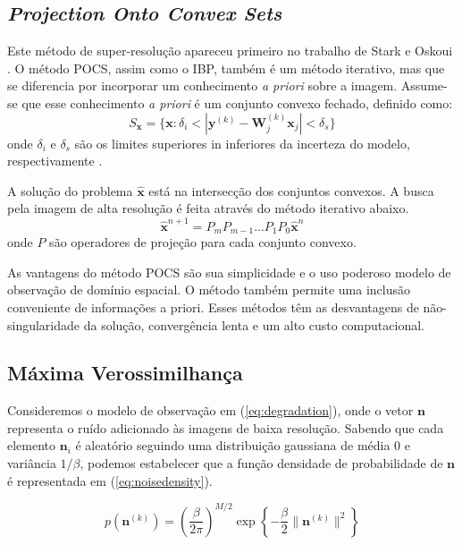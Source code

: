 \subsection{\emph{Projection Onto Convex Sets}}
Este método de super-resolução apareceu primeiro no trabalho de Stark e Oskoui \cite{stark1989high}.
O método POCS, assim como o IBP, também é um método iterativo, mas que se diferencia por incorporar um conhecimento \emph{a priori} sobre a imagem. Assume-se que esse conhecimento \emph{a priori} é um conjunto convexo fechado, definido como:
\begin{equation}
	S_{\mathbf{x}} = \{ \mathbf{x} : \delta_i < |\mathbf{y}^{(k)}-\mathbf{W}^{(k)}_j \mathbf{x}_j| < \delta_s \}
\end{equation}
onde $\delta_i$ e $\delta_s$ são os limites superiores in inferiores da incerteza do modelo, respectivamente \cite{nasrollahi2014super}.

A solução do problema $\hat{\mathbf{x}}$ está na intersecção dos conjuntos convexos. A busca pela imagem de alta resolução é feita através do método iterativo abaixo\cite{reis2014metodo}.
\begin{equation}
	\hat{\mathbf{x}}^{n+1} = P_m P_{m-1} ... P_1 P_0 \hat{\mathbf{x}}^{n}
\end{equation}
onde $P$ são operadores de projeção para cada conjunto convexo.

\begin{citacao}
As vantagens do método POCS são sua simplicidade e o uso poderoso modelo de observação de domínio espacial. O método também permite uma inclusão conveniente de informações a priori. Esses métodos têm as desvantagens de não-singularidade da solução, convergência lenta e um alto custo computacional. \cite{park2003super}
\end{citacao}

\subsection{Máxima Verossimilhança}
\label{sec:metodosprob}

Consideremos o modelo de observação em (\ref{eq:degradation}), onde o vetor
$\mathbf{n}$ representa o ruído adicionado às imagens de baixa resolução.
Sabendo que cada elemento $\mathbf{n}_i$ é aleatório seguindo uma distribuição
gaussiana de média 0 e variância $1/\beta$, podemos estabelecer que a função
densidade de probabilidade de $\mathbf{n}$ é representada em (\ref{eq:noisedensity}).

\begin{equation}
	\label{eq:noisedensity}
	p(\mathbf{n}^{(k)}) = \left(\frac{ \beta}{2\pi} \right)^{M/2}
	\exp{\left\{  -  \frac{\beta}{2}\|\mathbf{n}^{(k)}\|^2 \right\}}
\end{equation}

